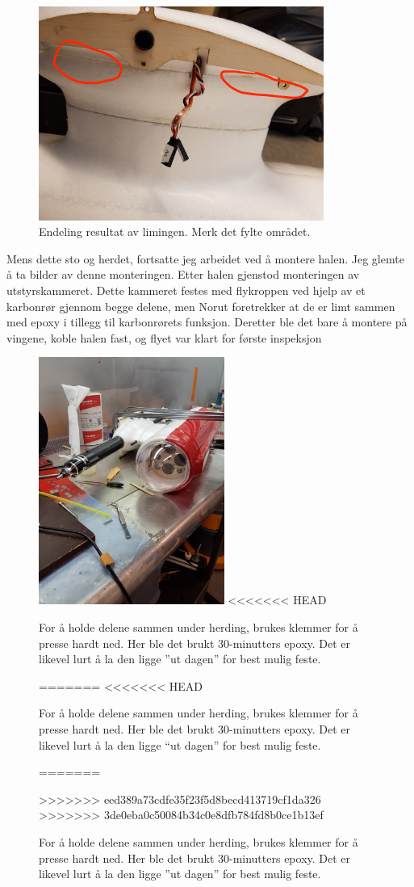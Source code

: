\documentclass[12pt, a4paper]{article}
\begin{document}
\begin{figure}[ht]
 \centering
 \includegraphics[height=7cm, width = .6\textwidth]{bilder/fylling2_red.jpg}
 \caption[Endelig limeresultat]{Endeling resultat av limingen. Merk det fylte området.}
\end{figure}
\newpage

Mens dette sto og herdet, fortsatte jeg arbeidet ved å montere halen. Jeg glemte å ta bilder av denne monteringen. Etter halen gjenstod monteringen av utstyrskammeret. Dette kammeret festes med flykroppen ved hjelp av et karbonrør gjennom begge delene, men Norut foretrekker at de er limt sammen med epoxy i tillegg til karbonrørets funksjon. Deretter ble det bare å montere på vingene, koble halen fast, og flyet var klart for første inspeksjon

\begin{figure}[ht]
	\centering
	\includegraphics[width = .5\textwidth, height = 8.1cm]{bilder/kammermontering.jpg}
<<<<<<< HEAD
	\caption[Herding av epoxy]{For å holde delene sammen under herding, brukes klemmer for å presse hardt ned. Her ble det brukt 30-minutters epoxy. Det er likevel lurt å la den ligge ''ut dagen'' for best mulig feste.}
=======
<<<<<<< HEAD
	\caption{For å holde delene sammen under herding, brukes klemmer for å presse hardt ned. Her ble det brukt 30-minutters epoxy. Det er likevel lurt å la den ligge ``ut dagen'' for best mulig feste.}
=======
	\caption[Herding av epoxy]{For å holde delene sammen under herding, brukes klemmer for å presse hardt ned. Her ble det brukt 30-minutters epoxy. Det er likevel lurt å la den ligge ''ut dagen'' for best mulig feste.}
>>>>>>> eed389a73cdfe35f23f5d8becd413719cf1da326
>>>>>>> 3de0eba0c50084b34c0e8dfb784fd8b0ce1b13ef
\end{figure}
\newpage
\end{document}
